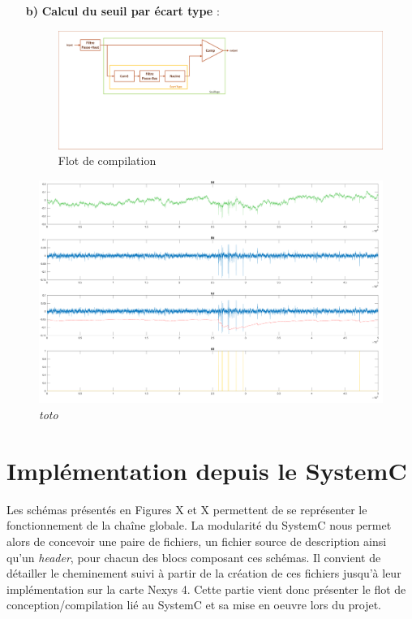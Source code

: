 \documentclass[a4paper,12pt]{article}
\begin{document}
\begin{itemize}
\begin{itemize}
	\newpage
	\item[\textbf{b)}] \textbf{Calcul du seuil par écart type} :
	\begin{figure}[H]
		\centering
		\includegraphics[scale=0.4, keepaspectratio]{chainXavier.pdf}
		\caption{Flot de compilation}
	\end{figure}
\end{itemize}
\end{itemize}
\begin{figure}[H]
\centering
\includegraphics[scale=0.18, keepaspectratio]{toto2.png}
\caption{\textit{toto}}
\end{figure}
\newpage
\section{Implémentation depuis le SystemC}
	Les schémas présentés en Figures X et X permettent de se représenter le fonctionnement de la chaîne globale. La modularité du SystemC nous permet alors de concevoir une paire de fichiers, un fichier source de description ainsi qu'un \textit{header}, pour chacun des blocs composant ces schémas. Il convient de détailler le cheminement suivi à partir de la création de ces fichiers jusqu'à leur implémentation sur la carte Nexys 4. Cette partie vient donc présenter le flot de conception/compilation lié au SystemC et sa mise en oeuvre lors du projet.
\end{document}
